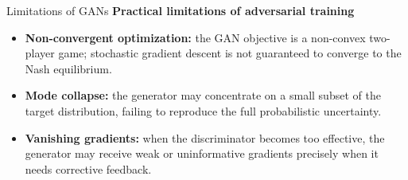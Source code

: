 \begin{frame}{Limitations of GANs}
\textbf{Practical limitations of adversarial training}

\vspace{0.5cm}

\begin{itemize}
    \item \textbf{Non-convergent optimization:}
    the GAN objective is a non-convex two-player game; stochastic
    gradient descent is not guaranteed to converge to the Nash equilibrium.
    \vspace{1cm}
    \item \textbf{Mode collapse:}
    the generator may concentrate on a small subset of the target
    distribution, failing to reproduce the full probabilistic uncertainty.
    \vspace{1cm}
    \item \textbf{Vanishing gradients:}
    when the discriminator becomes too effective, the generator may
    receive weak or uninformative gradients precisely when it needs
    corrective feedback.

\end{itemize}


\end{frame}
